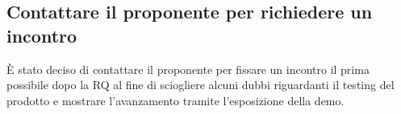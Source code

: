 \begin{itemize}
\subsection{Contattare il proponente per richiedere un incontro}

\`E stato deciso di contattare il proponente per fissare un incontro il prima possibile dopo la RQ al fine di sciogliere alcuni dubbi riguardanti il testing del prodotto e mostrare l'avanzamento tramite l'esposizione della demo.

\end{itemize}

